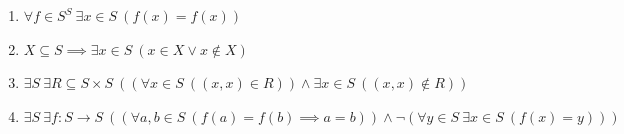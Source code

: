 \documentclass[11pt,a4paper]{article}
\begin{document}
\begin{enumerate}
\item $\displaystyle \forall f \in S^{S}\ \exists x \in S\ (f(x) = f(x))$
\item $\displaystyle X \subseteq S \implies \exists x \in S\ (x \in X \lor x \notin X)$
\item $\displaystyle \exists S\ \exists R \subseteq S \times S\ ((\forall x \in S\ ((x, x) \in R)) \land \exists x \in S\ ((x, x) \notin R))$
\item $\displaystyle \exists S\ \exists f \colon S \to S\ ((\forall a, b \in S\ (f(a) = f(b) \implies a = b)) \land \lnot (\forall y \in S\ \exists x \in S\ (f(x) = y)))$
\end{enumerate}
\end{document}
